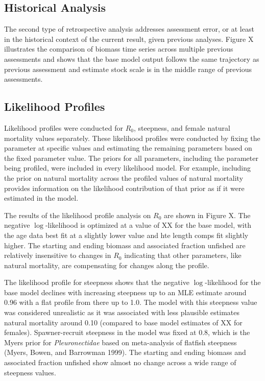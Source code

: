 \documentclass[
]{scrartcl}
\begin{document}
\subsection{Historical Analysis}\label{historical-analysis}

The second type of retrospective analysis addresses assessment error, or
at least in the historical context of the current result, given previous
analyses. Figure X illustrates the comparison of biomass time series
across multiple previous assessments and shows that the base model
output follows the same trajectory as previous assessment and estimate
stock scale is in the middle range of previous assessments.

\subsection{Likelihood Profiles}\label{likelihood-profiles}

Likelihood profiles were conducted for \(R_0\), steepness, and female
natural mortality values separately. These likelihood profiles were
conducted by fixing the parameter at specific values and estimating the
remaining parameters based on the fixed parameter value. The priors for
all parameters, including the parameter being profiled, were included in
every likelihood model. For example, including the prior on natural
mortality across the profiled values of natural mortality provides
information on the likelihood contribution of that prior as if it were
estimated in the model.

The results of the likelihood profile analysis on \(R_0\) are shown in
Figure X. The negative $\log$-likelihood is optimized at a value of XX for
the base model, with the age data best fit at a slightly lower value and
hte length comps fit slightly higher. The starting and ending biomass
and associated fraction unfished are relatively insensitive to changes
in \(R_0\) indicating that other parameters, like natural mortality, are
compensating for changes along the profile.

The likelihood profile for steepness shows that the negative
$\log$-likelihood for the base model declines with increasing steepness up
to an MLE estimate around 0.96 with a flat profile from there up to 1.0.
The model with this steepness value was considered unrealistic as it was
associated with less plausible estimates natural mortality around 0.10
(compared to base model estimates of XX for females). Spawner-recruit
steepness in the model was fixed at 0.8, which is the Myers prior for
\textit{Pleuronectidae} based on meta-analysis of flatfish steepness (Myers,
Bowen, and Barrowman 1999). The starting and ending biomass and
associated fraction unfished show almost no change across a wide range
of steepness values.
\end{document}
